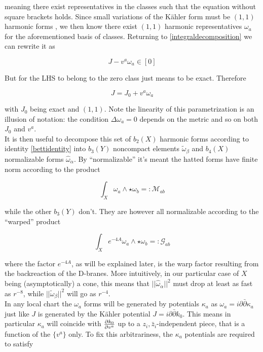 meaning there exist representatives in the classes such that the equation without square brackets holds. Since small variations of the K\"ahler form must be $(1,1)$ harmonic forms , we then know there exist $(1,1)$ harmonic representatives $\omega_a$ for the aforementioned basis of classes. Returning to \ref{integraldecomposition} we can rewrite it as

\begin{equation}
	J - v^a \omega_a \in [0]
\end{equation}

But for the LHS to belong to the zero class just means to be exact. Therefore

\begin{equation}
	J = J_0 + v^a \omega_a \label{JandJ0}
\end{equation}

with $J_0$ being exact and $(1,1)$. Note the linearity of this parametrization is an illusion of notation: the condition $\Delta \omega_a = 0$ depends on the metric and so on both $J_0$ and $v^a$.\\

It is then useful to decompose this set of $b_2(X)$ harmonic forms according to identity \ref{bettidentity} into $b_3(Y)$ noncompact elements $\tilde\omega_\beta$ and $b_4(X)$ normalizable forms $\hat\omega_\alpha$. By ``normalizable'' it's meant the hatted forms have finite norm according to the product

\begin{equation}
	\int_X \omega_a \wedge \star \omega_b =: \mathcal{M}_{ab} \label{defM}
\end{equation}

while the other $b_3(Y)$ don't. They are however all normalizable according to the ``warped'' product

\begin{equation}
	\int_X e^{-4A} \omega_a \wedge \star \omega_b =: \mathcal{G}_{ab} \label{defG}
\end{equation}

where the factor $e^{-4A}$, as will be explained later, is the warp factor resulting from the backreaction of the D-branes. More intuitively, in our particular case of $X$ being (asymptotically) a cone, this means that $||\hat\omega_\alpha||^2$ must drop at least as fast as $r^{-8}$, while $||\tilde\omega_\beta||^2$ will go as $r^{-4}$.\\

In any local chart the $\omega_a$ forms will be generated by potentials $\kappa_a$ as $\omega_a = i \partial \bar \partial \kappa_a$ just like $J$ is generated by the K\"ahler potential $J = i \partial \bar \partial k_0$. This means in particular $\kappa_a$ will coincide with $\frac{\partial k_0}{\partial v^a}$ up to a $z_i, \bar z_i$-independent piece, that is a function of the $\{v^a\}$ only. To fix this arbitrariness, the $\kappa_a$ potentials are required to satisfy

